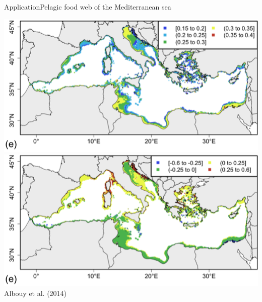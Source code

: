 \documentclass{eecslides}
\begin{document}
	\begin{frame}{Application}{Pelagic food web of the Mediterranean sea}	  
		\begin{center}
			\includegraphics[height=0.35\textheight]{med_present}\\
			\includegraphics[height=0.35\textheight]{med_future}\\
			\footnotesize{Albouy et al. (2014)}
		\end{center}
	\end{frame}

\end{document}
